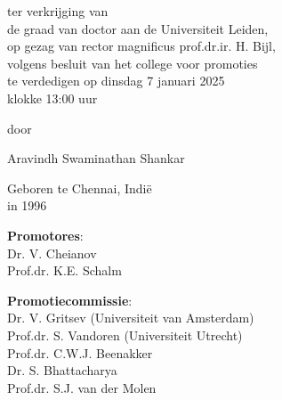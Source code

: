 \begin{titlepage}
\begin{center}
    
     {\large ter verkrijging van \\ de graad van doctor aan de Universiteit Leiden, \\ op gezag van rector magnificus prof.dr.ir. H. Bijl, \\ volgens besluit van het college voor promoties \\ te verdedigen op dinsdag 7 januari 2025 \\ klokke 13:00  uur}
	
	\vspace{3\baselineskip} %
	
    {\large door}  %
    
    \vspace{3\baselineskip} %
    
	{\Large Aravindh Swaminathan Shankar}
    
    
    {\large Geboren te Chennai, Indi{\"e}\\in 1996}
    
	\vfill %
\end{center}

\clearpage
\thispagestyle{empty}

\medskip
\noindent \textbf{Promotores}:\\
Dr. V. Cheianov\\
Prof.dr. K.E. Schalm 

\bigskip
\noindent \textbf{Promotiecommissie}: \\
Dr. V. Gritsev (Universiteit van Amsterdam)\\
Prof.dr. S. Vandoren (Universiteit Utrecht)\\
Prof.dr. C.W.J. Beenakker \\
Dr. S. Bhattacharya \\
Prof.dr. S.J. van der Molen \\






\end{titlepage}
